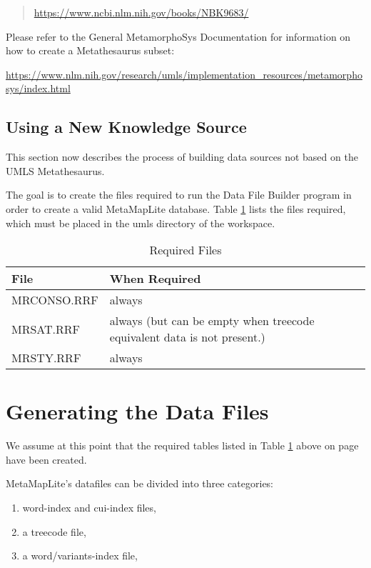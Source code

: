 \documentclass[letterpaper,article]{memoir}
\def\tt{\ttfamily}
\def\bf{\bfseries}
\begin{document}
{\small
\begin{quote}
\url{https://www.ncbi.nlm.nih.gov/books/NBK9683/}
\end{quote}
}

Please refer to the General MetamorphoSys Documentation for
information on how to create a Metathesaurus subset:

\url{https://www.nlm.nih.gov/research/umls/implementation_resources/metamorphosys/index.html}



\section{Using a New Knowledge Source}\label{Using New KS}

This section now describes the process of building data sources
not based on the UMLS Metathesaurus.

The goal is to create the files required to run the Data File
Builder program in order to create a valid MetaMapLite database.
Table \ref{tab:required_files} lists the files required,
which must be placed in the {\tt umls} directory of the workspace.
\begin{table}
  \centering
\begin{tabular}{|l|p{2.1in}|} \hline
\bf File   & \bf When Required \\ \hline
    MRCONSO.RRF & always \\ \hline
    MRSAT.RRF   & always (but can be empty when treecode equivalent
                  data is not present.) \\ \hline
    MRSTY.RRF   & always  \\ \hline
\end{tabular}
\caption{Required Files}
\label{tab:required_files}
\end{table}


\chapter{Generating the Data Files}\label{Generating}

We assume at this point that the required tables
listed  in Table \ref{tab:required_files} above
on page \pageref{tab:required_files} have been created.

MetaMapLite's datafiles can be divided into three categories:
\begin{enumerate}
    \item word-index and cui-index files,
    \item a treecode file, 
    \item a word/variants-index file,
\end{enumerate}
\end{document}
